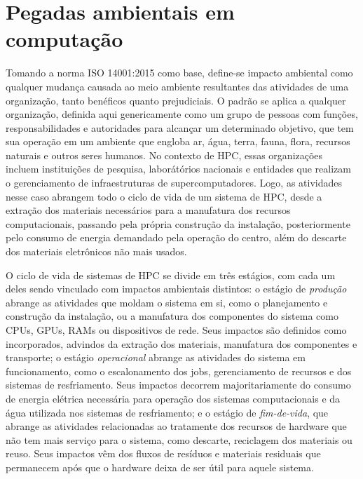 \section{Pegadas ambientais em computação}
\label{sec:pegadas-em-computacao}

Tomando a norma ISO 14001:2015 como base, define-se impacto ambiental como qualquer mudança causada
ao meio ambiente resultantes das atividades de uma organização, tanto benéficos quanto prejudiciais. O padrão
se aplica a qualquer organização, definida aqui genericamente como um grupo de pessoas com funções, responsabilidades
e autoridades para alcançar um determinado objetivo, que tem sua operação em um ambiente que engloba
ar, água, terra, fauna, flora, recursos naturais e outros seres humanos. No contexto de HPC, essas organizações
incluem instituições de pesquisa, laborátórios nacionais e entidades que realizam o gerenciamento de infraestruturas
de supercomputadores. Logo, as atividades nesse caso abrangem todo o ciclo de vida de um sistema de HPC, 
desde a extração dos materiais necessários para a manufatura dos recursos computacionais, passando pela 
própria construção da instalação, posteriormente pelo consumo de energia demandado pela operação do centro,
além do descarte dos materiais eletrônicos não mais usados.

O ciclo de vida de sistemas de HPC se divide em três estágios, com cada um deles sendo vinculado com impactos
ambientais distintos: o estágio de \textit{produção} abrange as atividades que moldam o sistema em si,
como o planejamento e construção da instalação, ou a manufatura dos componentes do sistema como CPUs, GPUs,
RAMs ou dispositivos de rede. Seus impactos são definidos como incorporados, advindos da extração dos materiais,
manufatura dos componentes e transporte; o estágio \textit{operacional} abrange as atividades do sistema
em funcionamento, como o escalonamento dos jobs, gerenciamento de recursos e dos sistemas de resfriamento. 
Seus impactos decorrem majoritariamente do consumo de energia elétrica necessária para operação dos sistemas 
computacionais e da água utilizada nos sistemas de resfriamento; e o estágio de \textit{fim-de-vida}, que abrange
as atividades relacionadas ao tratamente dos recursos de hardware que não tem mais serviço para o sistema, 
como descarte, reciclagem dos materiais ou reuso. Seus impactos vêm dos fluxos de resíduos e materiais residuais
que permanecem após que o hardware deixa de ser útil para aquele sistema.

